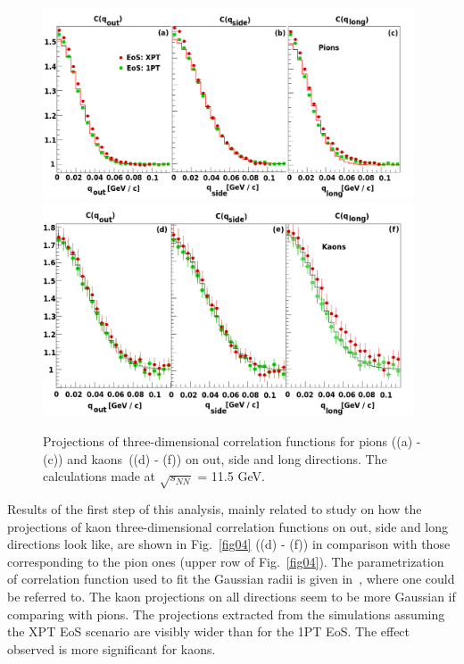 \documentclass[a4paper]{panl}
\begin{document}
 \begin{figure}[t]
    \begin{center}
      \includegraphics[width=110mm]{fig4a.png}
      \includegraphics[width=110mm]{fig4b.png}
      \vspace{-3mm}
      \caption{Projections of three-dimensional correlation functions for pions ((a) - (c)) and \newline kaons~((d) - (f)) on out, side and long directions.
      The calculations made at $\sqrt{s_{NN}}$ = 11.5 GeV.}
    \end{center}
    \vspace{-5mm}
  \end{figure}

 Results of the first step of this analysis, mainly related to study on how the projections of kaon three-dimensional correlation functions on out, side and long directions look like,
 are shown in Fig.~\ref{fig04} ((d) - (f)) in comparison with those corresponding to the pion ones (upper row of Fig.~\ref{fig04}). The parametrization of correlation function used to fit
 the Gaussian radii is given in~\cite{Batyuk:2017smw}, where one could be referred to.
 The kaon projections on all directions seem to be more Gaussian if comparing with pions. The projections extracted from the simulations assuming the XPT EoS scenario are visibly wider than
 for the 1PT EoS. The effect observed is more significant for kaons.   
\end{document}
